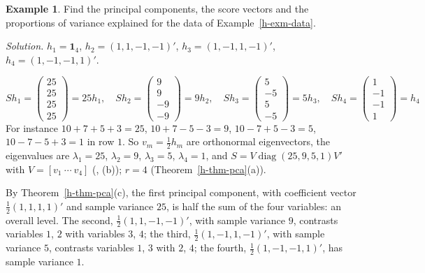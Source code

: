\documentclass[12pt]{article}
\newcommand{\one}{\mathbf 1}
\DeclareMathOperator{\diag}{diag}
\theoremstyle{definition}
\newtheorem{example}[theorem]{Example}
\begin{document}
\begin{example}\label{h-exm-pca}
Find the principal components, the score vectors and the proportions of variance explained for the data of
Example~\ref{h-exm-data}.
\end{example}
\par{}
\textit{Solution.} \(h_1=\one_4\), \(h_2=(1,1,-1,-1)'\), \(h_3=(1,-1,1,-1)'\), \(h_4=(1,-1,-1,1)'\).
\begin{board}[\(Sh_m\) row by row (\(S\) of Example~\ref{h-exm-data}); the \(h_m\) are orthogonal, \(\lVert h_m\rVert=2\):]
\[
Sh_1=\begin{pmatrix}25\\25\\25\\25\end{pmatrix}=25h_1,\quad
Sh_2=\begin{pmatrix}9\\9\\-9\\-9\end{pmatrix}=9h_2,\quad
Sh_3=\begin{pmatrix}5\\-5\\5\\-5\end{pmatrix}=5h_3,\quad
Sh_4=\begin{pmatrix}1\\-1\\-1\\1\end{pmatrix}=h_4
\]
For instance \(10+7+5+3=25\), \(10+7-5-3=9\), \(10-7+5-3=5\), \(10-7-5+3=1\) in row \(1\). So \(v_m=\frac12h_m\) are
orthonormal eigenvectors, the eigenvalues are \(\lambda_1=25\), \(\lambda_2=9\), \(\lambda_3=5\), \(\lambda_4=1\), and
\(S=V\diag(25,9,5,1)V'\) with \(V=[v_1\ \cdots\ v_4]\) (, (b)); \(r=4\)
(Theorem~\ref{h-thm-pca}(a)).
\end{board}
By Theorem~\ref{h-thm-pca}(c), the first principal component, with coefficient vector \(\frac12(1,1,1,1)'\) and sample
variance \(25\), is half the sum of the four variables: an overall level. The second, \(\frac12(1,1,-1,-1)'\), with
sample variance \(9\), contrasts variables \(1\), \(2\) with variables \(3\), \(4\); the third, \(\frac12(1,-1,1,-1)'\),
with sample variance \(5\), contrasts variables \(1\), \(3\) with \(2\), \(4\); the fourth, \(\frac12(1,-1,-1,1)'\), has
sample variance \(1\).
\end{document}
